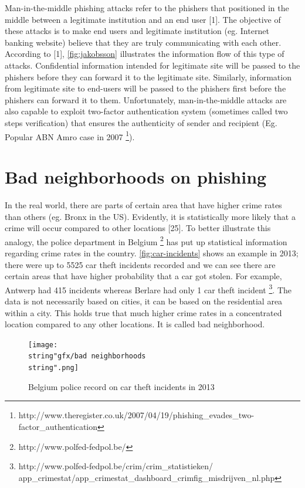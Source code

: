 Man-in-the-middle phishing attacks refer to the phishers that positioned
in the middle between a legitimate institution and an end user {[}1{]}.
The objective of these attacks is to make end users and legitimate
institution (eg. Internet banking website) believe that they are truly
communicating with each other. According to {[}1{]}, \autoref{fig:jakobsson}
illustrates the information flow of this type of attacks. Confidential
information intended for legitimate site will be passed to the phishers
before they can forward it to the legitimate site. Similarly, information
from legitimate site to end-users will be passed to the phishers first
before the phishers can forward it to them. Unfortunately, man-in-the-middle
attacks are also capable to exploit two-factor authentication system
(sometimes called two steps verification) that ensures the authenticity
of sender and recipient (Eg. Popular ABN Amro case in 2007%
\footnote{http://www.theregister.co.uk/2007/04/19/phishing\_evades\_two-factor\_authentication%
}).


\section{Bad neighborhoods on phishing}

In the real world, there are parts of certain area that have higher
crime rates than others (eg. Bronx in the US). Evidently, it is statistically
more likely that a crime will occur compared to other locations {[}25{]}.
To better illustrate this analogy, the police department in Belgium%
\footnote{http://www.polfed-fedpol.be/%
} has put up statistical information regarding crime rates in the country.
\autoref{fig:car-incidents} shows an example in 2013; there were
up to 5525 car theft incidents recorded and we can see there are certain
areas that have higher probability that a car got stolen. For example,
Antwerp had 415 incidents whereas Berlare had only 1 car theft incident%
\footnote{http://www.polfed-fedpol.be/crim/crim\_statistieken/ app\_crimestat/app\_crimestat\_dashboard\_crimfig\_misdrijven\_nl.php%
}. The data is not necessarily based on cities, it can be based on
the residential area within a city. This holds true that much higher
crime rates in a concentrated location compared to any other locations.
It is called bad neighborhood. 

\begin{figure}


\begin{centering}
\texttt{[image: \\string"gfx/bad neighborhoods\\string".png]}\protect\caption{\label{fig:car-incidents}Belgium police record on car theft incidents
in 2013}

\par\end{centering}

\end{figure}


